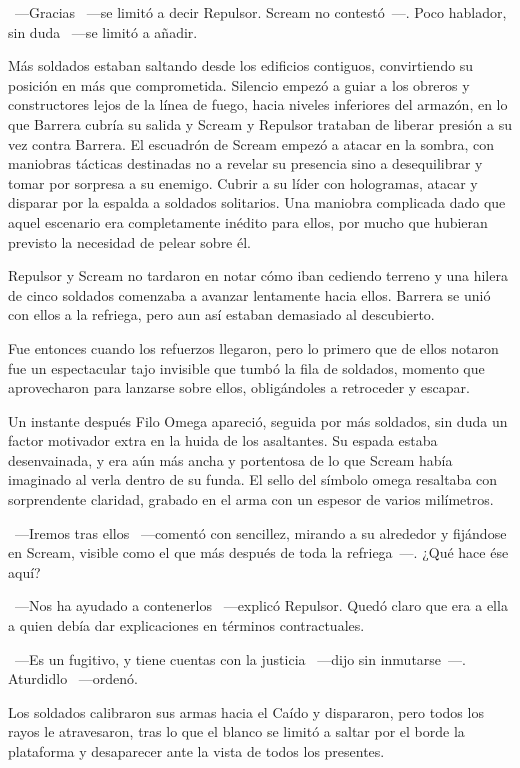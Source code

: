 ~---Gracias ~---se limitó a decir Repulsor. Scream no contestó~---. Poco hablador, sin duda ~---se limitó a añadir.

Más soldados estaban saltando desde los edificios contiguos, convirtiendo su posición en más que comprometida. Silencio empezó a guiar a los obreros y constructores lejos de la línea de fuego, hacia niveles inferiores del armazón, en lo que Barrera cubría su salida y Scream y Repulsor trataban de liberar presión a su vez contra Barrera. El escuadrón de Scream empezó a atacar en la sombra, con maniobras tácticas destinadas no a revelar su presencia sino a desequilibrar y tomar por sorpresa a su enemigo. Cubrir a su líder con hologramas, atacar y disparar por la espalda a soldados solitarios. Una maniobra complicada dado que aquel escenario era completamente inédito para ellos, por mucho que hubieran previsto la necesidad de pelear sobre él.

Repulsor y Scream no tardaron en notar cómo iban cediendo terreno y una hilera de cinco soldados comenzaba a avanzar lentamente hacia ellos. Barrera se unió con ellos a la refriega, pero aun así estaban demasiado al descubierto.

Fue entonces cuando los refuerzos llegaron, pero lo primero que de ellos notaron fue un espectacular tajo invisible que tumbó la fila de soldados, momento que aprovecharon para lanzarse sobre ellos, obligándoles a retroceder y escapar.

Un instante después Filo Omega apareció, seguida por más soldados, sin duda un factor motivador extra en la huida de los asaltantes. Su espada estaba desenvainada, y era aún más ancha y portentosa de lo que Scream había imaginado al verla dentro de su funda. El sello del símbolo omega resaltaba con sorprendente claridad, grabado en el arma con un espesor de varios milímetros.

~---Iremos tras ellos ~---comentó con sencillez, mirando a su alrededor y fijándose en Scream, visible como el que más después de toda la refriega~---. ¿Qué hace ése aquí?

~---Nos ha ayudado a contenerlos ~---explicó Repulsor. Quedó claro que era a ella a quien debía dar explicaciones en términos contractuales.

~---Es un fugitivo, y tiene cuentas con la justicia ~---dijo sin inmutarse~---. Aturdidlo ~---ordenó.

Los soldados calibraron sus armas hacia el Caído y dispararon, pero todos los rayos le atravesaron, tras lo que el blanco se limitó a saltar por el borde la plataforma y desaparecer ante la vista de todos los presentes.

